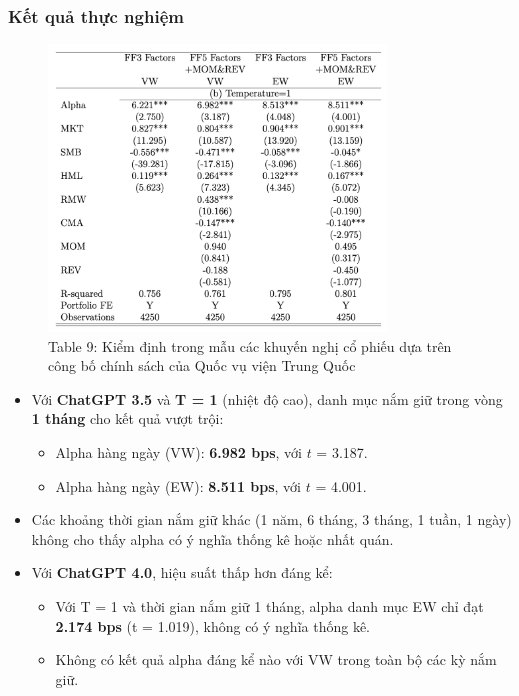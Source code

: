\documentclass[a4paper,12pt]{article}
\begin{document}
\subsubsection{Kết quả thực nghiệm}
\begin{figure}[H]
    \centering
    \includegraphics[width=0.8\textwidth]{table/tab9b.png}
    \caption*{Table 9: Kiểm định trong mẫu các khuyến nghị cổ phiếu dựa trên công bố chính sách của Quốc vụ viện Trung Quốc}
    \label{fig:fig2}
\end{figure}
\begin{itemize}
    \item Với \textbf{ChatGPT 3.5} và \textbf{T = 1} (nhiệt độ cao), danh mục nắm giữ trong vòng \textbf{1 tháng} cho kết quả vượt trội:
    \begin{itemize}
        \item Alpha hàng ngày (VW): \textbf{6.982 bps}, với $t$ = 3.187.
        \item Alpha hàng ngày (EW): \textbf{8.511 bps}, với $t$ = 4.001.
    \end{itemize}
    \item Các khoảng thời gian nắm giữ khác (1 năm, 6 tháng, 3 tháng, 1 tuần, 1 ngày) không cho thấy alpha có ý nghĩa thống kê hoặc nhất quán.
    \item Với \textbf{ChatGPT 4.0}, hiệu suất thấp hơn đáng kể:
    \begin{itemize}
        \item Với T = 1 và thời gian nắm giữ 1 tháng, alpha danh mục EW chỉ đạt \textbf{2.174 bps} (t = 1.019), không có ý nghĩa thống kê.
        \item Không có kết quả alpha đáng kể nào với VW trong toàn bộ các kỳ nắm giữ.
    \end{itemize}
\end{itemize}
\end{document}
